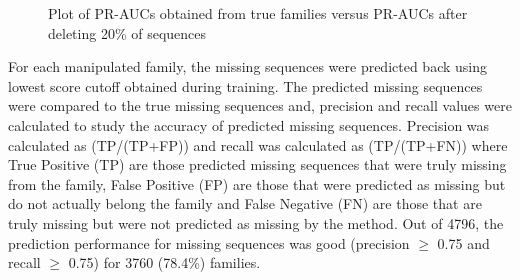 \documentclass{article}
\begin{document}
		\begin{figure}
			\caption{Plot of PR-AUCs obtained from true families versus PR-AUCs after deleting 20\% of sequences}
			\label{fig:scatter_pr-auc_true_vs_pr-auc_delete_ygob}
		\end{figure}
	
		For each manipulated family, the missing sequences were predicted 
		back using lowest score cutoff obtained during training. The predicted missing sequences were compared to the true missing sequences and, precision and recall values were calculated to study the accuracy of predicted missing sequences. Precision was calculated as (TP/(TP+FP)) and recall was calculated as (TP/(TP+FN)) where True Positive (TP) are those predicted missing sequences that were truly missing from the family, False Positive (FP) are those that were predicted as missing but do not actually belong the family and False Negative (FN) are those that are truly missing but were not predicted as missing by the method. Out of 4796, the prediction performance for missing sequences was good (precision $\geq$ 0.75 and recall $\geq$ 0.75) for 3760 (78.4\%) families.
		
\end{document}
